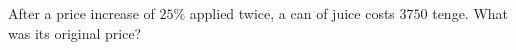 After a price increase of $25\%$ applied twice, a can of juice costs $3750$ tenge. What was its original price?
